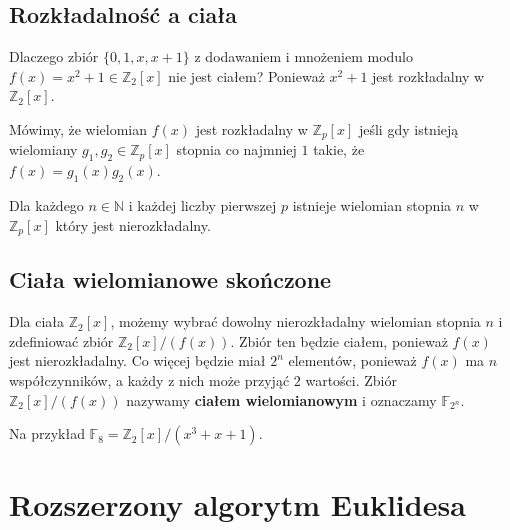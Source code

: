 \documentclass{../notatki}
\begin{document}
\subsection{Rozkładalność a ciała}

Dlaczego zbiór $\{0, 1, x, x + 1\}$ z dodawaniem i mnożeniem modulo
$f(x) = x^2 + 1 \in \mathbb{Z}_2[x]$ nie jest ciałem? Ponieważ $x^2 +
1$ jest rozkładalny w $\mathbb{Z}_2[x]$.

Mówimy, że wielomian $f(x)$ jest rozkładalny w $\mathbb{Z}_p[x]$
jeśli gdy istnieją
wielomiany $g_1, g_2 \in \mathbb{Z}_p[x]$ stopnia co najmniej $1$ takie, że
$f(x) = g_1(x)g_2(x)$.

Dla każdego $n \in \mathbb{N}$ i każdej liczby pierwszej $p$ istnieje wielomian
stopnia $n$ w $\mathbb{Z}_p[x]$ który jest nierozkładalny.

\subsection{Ciała wielomianowe skończone}

Dla ciała $\mathbb{Z}_2[x]$, możemy wybrać dowolny nierozkładalny wielomian
stopnia $n$ i zdefiniować zbiór $\mathbb{Z}_2[x] / (f(x))$. Zbiór ten
będzie ciałem, ponieważ $f(x)$ jest nierozkładalny. Co więcej będzie miał
$2^n$ elementów, ponieważ $f(x)$ ma $n$ współczynników, a każdy z nich
może przyjąć $2$ wartości. Zbiór $\mathbb{Z}_2[x] / (f(x))$ nazywamy
\textbf{ciałem wielomianowym} i oznaczamy $\mathbb{F}_{2^n}$.

Na przykład $\mathbb{F}_8 = \mathbb{Z}_2[x]/(x^3 + x + 1)$.

\section{Rozszerzony algorytm Euklidesa}
\end{document}
